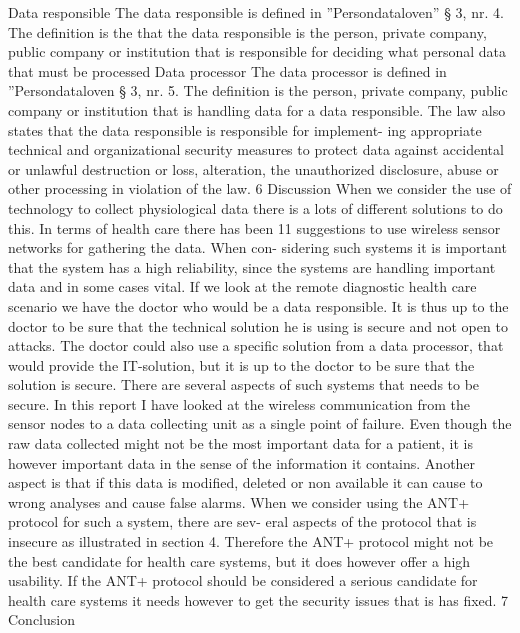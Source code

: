 Data responsible The data responsible is defined in ”Persondataloven” § 3, nr. 4. The definition is the that the data responsible is the person, private company, public company or institution that is responsible for deciding what personal data that must be processed
Data processor The data processor is defined in ”Persondataloven § 3, nr. 5. The definition is the person, private company, public company or institution that is handling data for a data responsible.
The law also states that the data responsible is responsible for implement- ing appropriate technical and organizational security measures to protect data against accidental or unlawful destruction or loss, alteration, the unauthorized disclosure, abuse or other processing in violation of the law.
6 Discussion
When we consider the use of technology to collect physiological data there is a lots of different solutions to do this. In terms of health care there has been
11
suggestions to use wireless sensor networks for gathering the data. When con- sidering such systems it is important that the system has a high reliability, since the systems are handling important data and in some cases vital. If we look at the remote diagnostic health care scenario we have the doctor who would be a data responsible. It is thus up to the doctor to be sure that the technical solution he is using is secure and not open to attacks. The doctor could also use a specific solution from a data processor, that would provide the IT-solution, but it is up to the doctor to be sure that the solution is secure.
There are several aspects of such systems that needs to be secure. In this report I have looked at the wireless communication from the sensor nodes to a data collecting unit as a single point of failure. Even though the raw data collected might not be the most important data for a patient, it is however important data in the sense of the information it contains. Another aspect is that if this data is modified, deleted or non available it can cause to wrong analyses and cause false alarms.
When we consider using the ANT+ protocol for such a system, there are sev- eral aspects of the protocol that is insecure as illustrated in section 4. Therefore the ANT+ protocol might not be the best candidate for health care systems, but it does however offer a high usability. If the ANT+ protocol should be considered a serious candidate for health care systems it needs however to get the security issues that is has fixed.
7 Conclusion
